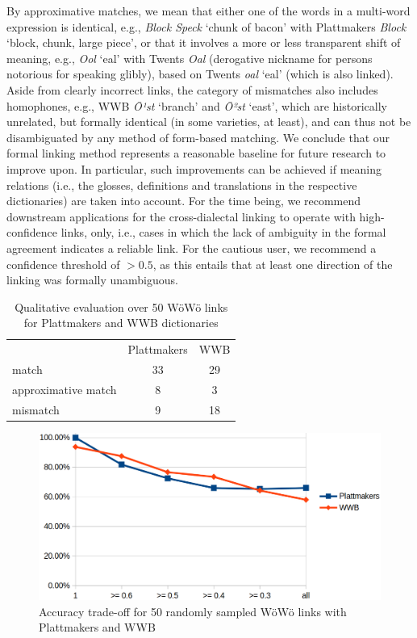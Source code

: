 \documentclass[11pt]{article}
\newcommand{\word}[1]{\textsl{#1}} %
\begin{document}
By approximative matches, we mean that either one of the words in a multi-word expression is identical, e.g., \word{Block Speck} `chunk of bacon' with Plattmakers \word{Block} `block, chunk, large piece', or that it involves a more or less transparent shift of meaning, e.g., \word{Ool} `eal' with Twents \word{Oal} (derogative nickname for persons notorious for speaking glibly), based on Twents \word{oal} `eal' (which is also linked). 
Aside from clearly incorrect links, the category of mismatches also includes homophones, e.g., WWB \word{Ō¹st} `branch' and \word{Ō²st} `east', which are historically unrelated, but formally identical (in some varieties, at least), and can thus not be disambiguated by any method of form-based matching.  We conclude that our formal linking method represents a reasonable baseline for future research to improve upon.
In particular, such improvements can be achieved if meaning relations (i.e., the glosses, definitions and translations in the respective dictionaries) are taken into account. 
For the time being, we recommend downstream applications for the cross-dialectal linking to operate with high-confidence links, only, i.e., cases in which the lack of ambiguity in the formal agreement indicates a reliable link. For the cautious user, we recommend a confidence threshold of $>0.5$, as this entails that at least one direction of the linking was formally unambiguous. 

\begin{table}
        \centering
        \begin{tabular}{lcc}
        & Plattmakers & WWB \\
        match & 33 & 29 \\
        approximative match & 8 & 3 \\
        mismatch & 9 & 18 \\
    \end{tabular}
    \caption{Qualitative evaluation over 50 WöWö links for Plattmakers and WWB dictionaries}
    \label{tab-eval}
\end{table}

\begin{figure}
    \centering
    \includegraphics[width=0.5\linewidth]{img/confidence-vs-accurracy.png}
    \caption{Accuracy trade-off for 50 randomly sampled WöWö links with Plattmakers and WWB}
    \label{fig:enter-label}
\end{figure}
\end{document}
